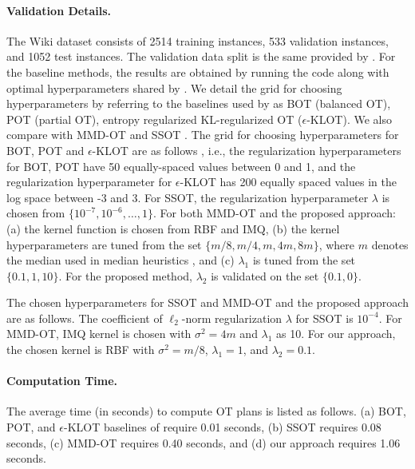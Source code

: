 \paragraph{Validation Details.} The Wiki dataset consists of 2514 training instances, 533 validation instances, and 1052 test instances. The validation data split is the same provided by \citet{arase-etal-2023-unbalanced}. For the baseline methods, the results are obtained by running the code along with optimal hyperparameters shared by \citet{arase-etal-2023-unbalanced}. We detail the grid for choosing hyperparameters by referring to the baselines used by \cite{arase-etal-2023-unbalanced} as BOT (balanced OT), POT (partial OT), entropy regularized KL-regularized OT ($\epsilon$-KLOT). We also compare with MMD-OT \citep{mmd-uot} and SSOT \citep{blondel18a}. The grid for choosing hyperparameters for BOT, POT and $\epsilon$-KLOT are as follows \cite{arase-etal-2023-unbalanced}, i.e., the regularization hyperparameters for BOT, POT have 50 equally-spaced values between 0 and 1, and the regularization hyperparameter for $\epsilon$-KLOT has 200 equally spaced values in the log space between -3 and 3. For SSOT, the regularization hyperparameter $\lambda$ is chosen from $\{10^{-7}, 10^{-6}, \ldots, 1\}$. 
For both MMD-OT and the proposed approach: (a) the kernel function is chosen from RBF and IMQ, (b) the kernel hyperparameters are tuned from the set $\{m/8, m/4, m, 4m, 8m\}$, where $m$ denotes the median used in median heuristics \citep{gretton12a}, and (c) $\lambda_1$ is tuned from the set $\{0.1, 1, 10\}$. For the proposed method, $\lambda_2$ is validated on the set $\{0.1,0\}$.

The chosen hyperparameters for SSOT and MMD-OT and the proposed approach are as follows. The coefficient of $\ell_2$-norm regularization $\lambda$ for SSOT is $10^{-4}$. 
For MMD-OT, IMQ kernel is chosen with $\sigma^2=4m$ and $\lambda_1$ as 10. 
For our approach, the chosen kernel is RBF with $\sigma^2=m/8$, $\lambda_1=1$, and $\lambda_2=0.1$. 

\paragraph{Computation Time.} The average time (in seconds) to compute OT plans is listed as follows. (a) BOT, POT, and $\epsilon$-KLOT baselines of \citet{arase-etal-2023-unbalanced} require 0.01 seconds, (b) SSOT requires 0.08 seconds, (c) MMD-OT requires 0.40 seconds, and (d) our approach requires 1.06 seconds. 

